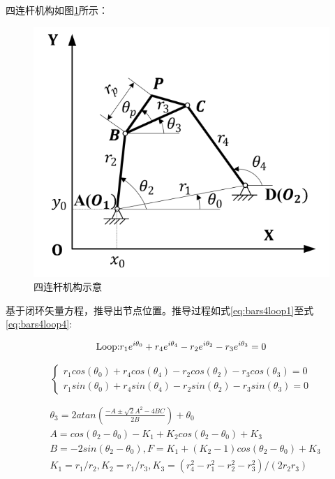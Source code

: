 \documentclass[]{ctexbook}
\begin{document}
四连杆机构如图\ref{fig:fourbars}所示：

\begin{figure}

{\centering \includegraphics[width=0.7\linewidth]{img/bars4} 

}

\caption{四连杆机构示意}\label{fig:fourbars}
\end{figure}

基于闭环矢量方程，推导出节点位置。推导过程如式\eqref{eq:bars4loop1}至式\eqref{eq:bars4loop4}:

\begin{equation}
\mathbf{\text{Loop:}}   r_1e^{i\theta_0} + r_4e^{i\theta_4} - r_2e^{i\theta_2} -r_3e^{i\theta_3} = 0\\
\label{eq:bars4loop1}
\end{equation}

\begin{equation}
\begin{cases} 
r_1cos(\theta_0) + r_4cos(\theta_4)-r_2cos(\theta_2)-r_3cos(\theta_3)=0 \\ 
r_1sin(\theta_0) + r_4sin(\theta_4)-r_2sin(\theta_2)-r_3sin(\theta_3)=0
\end{cases}
\label{eq:bars4loop2}
\end{equation}

\begin{equation}
\begin{split}
&\theta_3 =2atan(\frac{-A\pm\sqrt{2}{A^2-4BC}}{2B})+\theta_0\\
&A = cos(\theta_2 - \theta_0)-K_1+K_2cos(\theta_2-\theta_0)+K_3\\
&B = -2sin(\theta_2-\theta_0), F=K_1+(K_2-1)cos(\theta_2-\theta_0)+K_3\\
&K_1 = r_1/r_2,K_2=r_1/r_3,K_3=(r_4^2-r_1^2-r_2^2-r_3^2)/(2r_2r_3)\\
\end{split}
\label{eq:bars4loop3}
\end{equation}
\end{document}
